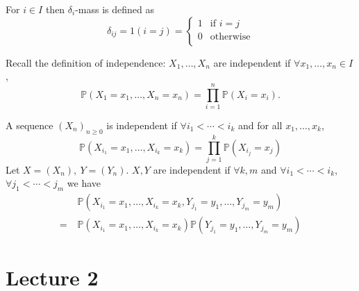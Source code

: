 \documentclass[a4paper]{article}
\begin{document}
\begin{definition}
    For $i\in I$ then $ \delta_i $-mass is defined as 
    \[
        \delta_{ij} = 1(i=j) = \begin{cases}
        1 &\text{if }i=j\\
        0 &\text{otherwise}\\
        \end{cases} 
    \]
\end{definition}
Recall the definition of independence: $ X_1,\dots,X_n $ are independent if $ \forall x_1,\dots,x_n\in I $, 
\[
    \mathbb{P}(X_1=x_1,\dots,X_n=x_n) = \prod_{i=1}^{n} \mathbb{P}(X_i=x_i).
\]
\begin{definition}
    A sequence $ (X_n)_{n\ge 0} $ is independent if $ \forall i_1<\cdots<i_k $ and for all $ x_1,\dots,x_k $, 
    \[
        \mathbb{P}(X_{i_1}=x_1,\dots,X_{i_k}=x_k) = \prod_{j=1}^{k}\mathbb{P}(X_{i_j}=x_j)
    \]
    Let $ X=(X_n),\ Y=(Y_n) $. $X,Y$ are independent if $ \forall k,m $ and $ \forall i_1<\cdots<i_k $, $ \forall j_1<\cdots<j_m $ we have 
    \begin{align*}
        &\mathbb{P}(X_{i_1}=x_1,\dots,X_{i_k}=x_k, Y_{j_1}=y_1,\dots,Y_{j_m}=y_m)\\
        =\;& \mathbb{P}(X_{i_1}=x_1,\dots,X_{i_k}=x_k) \mathbb{P}(Y_{j_1}=y_1,\dots,Y_{j_m}=y_m)
    \end{align*}
\end{definition}

\newpage
\part*{Lecture 2}
\end{document}
